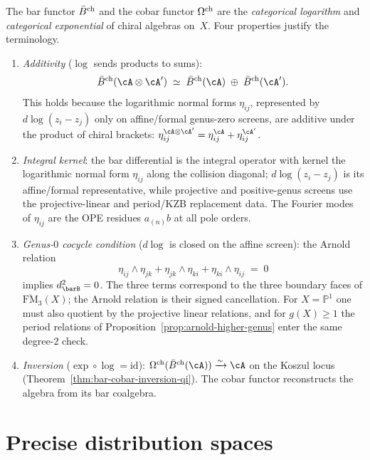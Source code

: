 \begin{definition}
\label{def:categorical-logarithm}
The bar functor $\bar{B}^{\mathrm{ch}}$ and the cobar functor $\Omega^{\mathrm{ch}}$ are
the \emph{categorical logarithm} and \emph{categorical
exponential} of chiral algebras on~$X$. Four properties
justify the terminology.
\begin{enumerate}[label=\textup{(\roman*)}]
\item \emph{Additivity} ($\log$ sends products to sums):
 \[
 \barBch(\cA\otimes\cA')
 \;\simeq\;
 \barBch(\cA)\;\oplus\;\barBch(\cA').
 \]
 This holds because the logarithmic normal forms
 \(\eta_{ij}\), represented by \(d\log(z_i-z_j)\) only on
 affine/formal genus-zero screens, are additive under the product of
 chiral brackets:
 $\eta_{ij}^{\cA\otimes\cA'}
 =\eta_{ij}^\cA+\eta_{ij}^{\cA'}$.
\item \emph{Integral kernel}:
 the bar differential is the integral operator with kernel the
 logarithmic normal form \(\eta_{ij}\) along the collision diagonal;
 \(d\log(z_i-z_j)\) is its affine/formal representative, while
 projective and positive-genus screens use the projective-linear and
 period/KZB replacement data.
 The Fourier modes of $\eta_{ij}$ are the OPE residues
 $a_{(n)}b$ at all pole orders.
\item \emph{Genus-$0$ cocycle condition} ($d\log$ is closed on the affine
 screen):
 the Arnold relation
 \[
 \eta_{ij}\wedge\eta_{jk}
 +\eta_{jk}\wedge\eta_{ki}
 +\eta_{ki}\wedge\eta_{ij}
 \;=\;0
 \]
 implies $d_{\barB}^2=0$. The three terms correspond to the
 three boundary faces of $\overline{\mathrm{FM}}_3(X)$;
 the Arnold relation is their signed cancellation. For
 $X=\mathbb{P}^1$ one must also quotient by the projective linear
 relations, and for $g(X)\geq1$ the period relations of
 Proposition~\ref{prop:arnold-higher-genus} enter the same degree-$2$
 check.
\item \emph{Inversion} ($\exp\circ\log=\mathrm{id}$):
 $\Omegach(\barBch(\cA))\xrightarrow{\sim}\cA$ on the Koszul
 locus (Theorem~\ref{thm:bar-cobar-inversion-qi}). The cobar
 functor reconstructs the algebra from its bar coalgebra.
\end{enumerate}
\end{definition}

\section{Precise distribution spaces}

